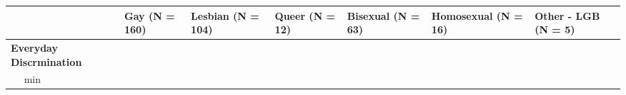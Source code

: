 \documentclass[
  english,
  man,floatsintext]{apa6}
\begin{document}
\begin{longtable}[]{@{}lllllll@{}}
\toprule
\begin{minipage}[b]{0.16\columnwidth}\raggedright
\strut
\end{minipage} & \begin{minipage}[b]{0.11\columnwidth}\raggedright
Gay (N = 160)\strut
\end{minipage} & \begin{minipage}[b]{0.11\columnwidth}\raggedright
Lesbian (N = 104)\strut
\end{minipage} & \begin{minipage}[b]{0.11\columnwidth}\raggedright
Queer (N = 12)\strut
\end{minipage} & \begin{minipage}[b]{0.11\columnwidth}\raggedright
Bisexual (N = 63)\strut
\end{minipage} & \begin{minipage}[b]{0.11\columnwidth}\raggedright
Homosexual (N = 16)\strut
\end{minipage} & \begin{minipage}[b]{0.11\columnwidth}\raggedright
Other - LGB (N = 5)\strut
\end{minipage}\tabularnewline
\midrule
\endhead
\begin{minipage}[t]{0.16\columnwidth}\raggedright
\textbf{Everyday Discrmination}\strut
\end{minipage} & \begin{minipage}[t]{0.11\columnwidth}\raggedright
~~\strut
\end{minipage} & \begin{minipage}[t]{0.11\columnwidth}\raggedright
~~\strut
\end{minipage} & \begin{minipage}[t]{0.11\columnwidth}\raggedright
~~\strut
\end{minipage} & \begin{minipage}[t]{0.11\columnwidth}\raggedright
~~\strut
\end{minipage} & \begin{minipage}[t]{0.11\columnwidth}\raggedright
~~\strut
\end{minipage} & \begin{minipage}[t]{0.11\columnwidth}\raggedright
~~\strut
\end{minipage}\tabularnewline
\begin{minipage}[t]{0.16\columnwidth}\raggedright
~~ min\strut
\end{minipage} & \begin{minipage}[t]{0.11\columnwidth}\raggedright

\end{minipage}
\end{longtable}
\end{document}
